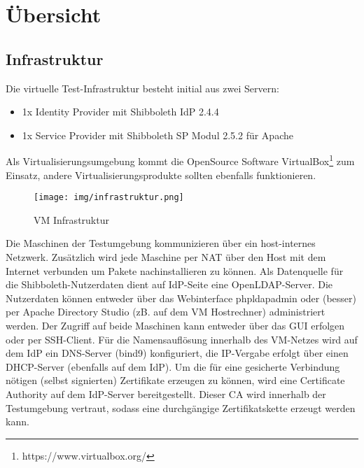 \section{Übersicht}
\subsection{Infrastruktur}
Die virtuelle Test-Infrastruktur besteht initial aus zwei Servern:
\begin{itemize}
  \item 1x Identity Provider mit Shibboleth IdP 2.4.4
  \item 1x Service Provider mit Shibboleth SP Modul 2.5.2 für Apache 
\end{itemize} 
Als Virtualisierungsumgebung kommt die OpenSource Software
VirtualBox\footnote{https://www.virtualbox.org/} zum Einsatz, andere
Virtualisierungsprodukte sollten ebenfalls funktionieren.

\begin{figure}[h!]
  \centering
    \texttt{[image: img/infrastruktur.png]}
    \caption{VM Infrastruktur}
\end{figure}

Die Maschinen der Testumgebung kommunizieren über ein host-internes Netzwerk.
Zusätzlich wird jede Maschine per NAT über den Host mit dem Internet verbunden
um Pakete nachinstallieren zu können. Als Datenquelle für die
Shibboleth-Nutzerdaten dient auf IdP-Seite eine OpenLDAP-Server. Die Nutzerdaten
können entweder über das Webinterface phpldapadmin oder (besser) per Apache
Directory Studio (zB. auf dem VM Hostrechner) administriert werden. Der Zugriff
auf beide Maschinen kann entweder über das GUI erfolgen oder per SSH-Client. Für
die Namensauflösung innerhalb des VM-Netzes wird auf dem IdP ein DNS-Server
(bind9) konfiguriert, die IP-Vergabe erfolgt über einen DHCP-Server (ebenfalls
auf dem IdP). Um die für eine gesicherte Verbindung nötigen (selbst signierten)
Zertifikate erzeugen zu können, wird eine Certificate Authority auf dem
IdP-Server bereitgestellt. Dieser CA wird innerhalb der Testumgebung vertraut,
sodass eine durchgängige Zertifikatskette erzeugt werden kann.


